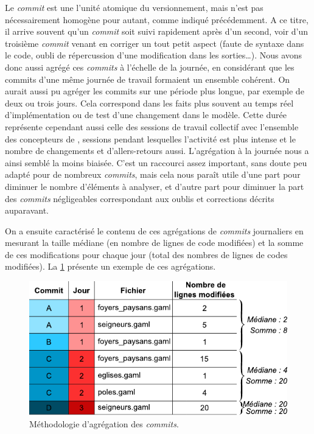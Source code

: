 Le \textit{commit} est une l'unité \og atomique\fg{} du versionnement, mais n'est pas nécessairement homogène pour autant, comme indiqué précédemment.
A ce titre, il arrive souvent qu'un \textit{commit} soit suivi rapidement après d'un second, voir d'un troisième \textit{commit} venant en corriger un tout petit aspect (faute de syntaxe dans le code, oubli de répercussion d'une modification dans les sorties\ldots).
Nous avons donc aussi agrégé ces \textit{commits} à l'échelle de la journée, en considérant que les commits d'une même journée de travail formaient un ensemble cohérent.
On aurait aussi pu agréger les commits sur une période plus longue, par exemple de deux ou trois jours.
Cela correspond dans les faits plus souvent au temps réel d'implémentation ou de test d'une changement dans le modèle.
Cette durée représente cependant aussi celle des sessions de travail collectif avec l'ensemble des concepteurs de \simfeodal{}, sessions pendant lesquelles l'activité est plus intense et le nombre de changements et d'allers-retours aussi.
L'agrégation à la journée nous a ainsi semblé la moins biaisée.
C'est un raccourci assez important, sans doute peu adapté pour de nombreux \textit{commits}, mais cela nous paraît utile d'une part pour diminuer le nombre d'éléments à analyser, et d'autre part pour diminuer la part des \textit{commits} négligeables correspondant aux oublis et corrections décrits auparavant.

On a ensuite caractérisé le contenu de ces agrégations de \textit{commits} journaliers en mesurant la taille médiane (en nombre de lignes de code modifiées) et la somme de ces modifications pour chaque jour (total des nombres de lignes de codes modifiées).
La \cref{fig:methodo-agreg-commits} présente un exemple de ces agrégations.

\begin{figure}[H]
	\centering
	\includegraphics[width=.75\linewidth]{img/tableau_exemple_commits.pdf}
	\caption[Méthodologie d'agrégation des \textit{commits}.]{Méthodologie d'agrégation des \textit{commits}.}
	\label{fig:methodo-agreg-commits}
\end{figure}


